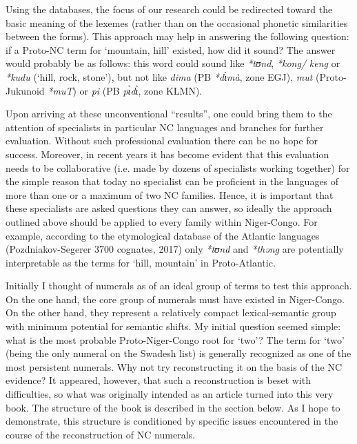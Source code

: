 Using the databases, the focus of our research could be redirected toward the basic meaning of the lexemes (rather than on the occasional phonetic similarities between the forms). This approach may help in answering the following question: if a Proto-NC term for ‘mountain, hill’ existed, how did it sound? The answer would probably be as follows: this word could sound like \textit{*tʊnd}, \textit{*kong/} \textit{keng} or \textit{*kudu} (‘hill, rock, stone’), but not like \textit{dima} (PB \textit{*d{\`{ɩ}}m{\`{a}}}, zone EGJ), \textit{mut} (Proto-Jukunoid \textit{*muT}) or \textit{pi} (PB \textit{p{\`{ɩ}}d{\`{ɩ}}}, zone KLMN). 

Upon arriving at these unconventional “results”, one could bring them to the attention of specialists in particular NC languages and branches for further evaluation. Without such professional evaluation there can be no hope for success.  Moreover, in recent years it has become evident that this evaluation needs to be collaborative (i.e. made by dozens of specialists working together) for the simple reason that today no specialist can be proficient in the languages of more than one or a maximum of two NC families. Hence, it is important that these specialists are asked questions they can answer, so ideally the approach outlined above should be applied to every family within Niger-Congo. For example, according to the etymological database of the Atlantic languages (Pozdniakov{}-Segerer 3700 cognates, 2017) only \textit{*t}\textit{ʊnd} and \textit{*th}\textit{əng} are potentially interpretable as the terms for ‘hill, mountain’ in Proto-Atlantic.

Initially I thought of numerals as of an ideal group of terms to test this approach. On the one hand, the core group of numerals must have existed in Niger-Congo. On the other hand, they represent a relatively compact lexical-semantic group with minimum potential for semantic shifts. My initial question seemed simple: what is the most probable Proto-Niger-Congo root for ‘two’? The term for ‘two’ (being the only numeral on the Swadesh list) is generally recognized as one of the most persistent numerals. Why not try reconstructing it on the basis of the NC evidence? It appeared, however, that such a reconstruction is beset with difficulties, so what was originally intended as an article turned into this very book. The structure of the book is described in the section below. As I hope to demonstrate, this structure is conditioned by specific issues encountered in the course of the reconstruction of NC numerals. 

